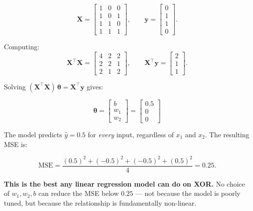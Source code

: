 \documentclass[12pt, a4paper]{article}
\newif\ifstudentmode
\newcommand{\sol}[2][6cm]{%
  \ifstudentmode
    \underline{\hspace{#1}}%
  \else
    {#2}%
  \fi
}
\newcommand{\soleq}[2][3cm]{%
  \ifstudentmode
    \par\vspace{4pt}%
    \noindent\rule{\linewidth}{0.5pt}\\[#1]%
    \noindent\rule{\linewidth}{0.5pt}%
    \par\vspace{4pt}%
  \else
    \[#2\]%
  \fi
}
\theoremstyle{definition}
\newcommand{\bth}{\boldsymbol{\theta}}
\newcommand{\bX}{\mathbf{X}}
\newcommand{\by}{\mathbf{y}}
\newcommand{\yhat}{\hat{y}}
\begin{document}
\[
  \bX =
  \begin{bmatrix} 1 & 0 & 0 \\ 1 & 0 & 1 \\ 1 & 1 & 0 \\ 1 & 1 & 1 \end{bmatrix},
  \qquad
  \by =
  \begin{bmatrix} 0 \\ 1 \\ 1 \\ 0 \end{bmatrix}.
\]

Computing:
\[
  \bX^{\top}\bX =
  \begin{bmatrix} 4 & 2 & 2 \\ 2 & 2 & 1 \\ 2 & 1 & 2 \end{bmatrix},
  \qquad
  \bX^{\top}\by =
  \begin{bmatrix} 2 \\ 1 \\ 1 \end{bmatrix}.
\]

Solving $(\bX^{\top}\bX)\,\bth = \bX^{\top}\by$ gives:

\soleq[2.5cm]{%
  \bth =
  \begin{bmatrix} b \\ w_1 \\ w_2 \end{bmatrix}
  =
  \begin{bmatrix} 0.5 \\ 0 \\ 0 \end{bmatrix}
}

The model predicts $\yhat = 0.5$ for \emph{every} input, regardless of $x_1$
and $x_2$.  The resulting MSE is:

\[
  \mathrm{MSE}
  = \frac{(0.5)^2 + (-0.5)^2 + (-0.5)^2 + (0.5)^2}{4}
  = \sol[4cm]{0.25}.
\]

\begin{warnbox}
\textbf{This is the best any linear regression model can do on XOR.}
No choice of $w_1, w_2, b$ can reduce the MSE below $0.25$ — not because
the model is poorly tuned, but because the relationship is fundamentally
non-linear.
\end{warnbox}

\end{document}
